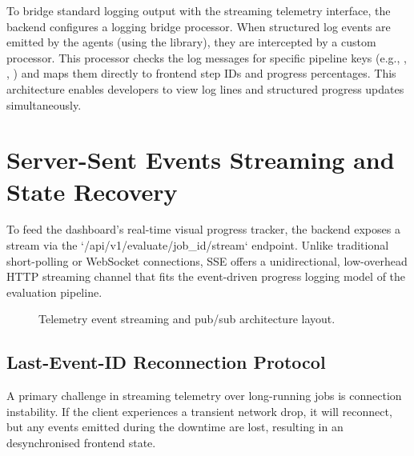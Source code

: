 To bridge standard logging output with the streaming telemetry interface, the backend configures a logging bridge processor. When structured log events are emitted by the agents (using the  library), they are intercepted by a custom processor. This processor checks the log messages for specific pipeline keys (e.g., , , ) and maps them directly to frontend step IDs and progress percentages. This architecture enables developers to view log lines and structured progress updates simultaneously.


\section{Server-Sent Events Streaming and State Recovery}
\label{sec:sse-streaming}

To feed the dashboard's real-time visual progress tracker, the backend exposes a  stream via the `/api/v1/evaluate/{job_id}/stream` endpoint. Unlike traditional short-polling or WebSocket connections, SSE offers a unidirectional, low-overhead HTTP streaming channel that fits the event-driven progress logging model of the evaluation pipeline.

\begin{figure}[htbp]
  \centering
  \caption{Telemetry event streaming and pub/sub architecture layout.}
  \label{fig:telemetry-infrastructure}
\end{figure}

\subsection{Last-Event-ID Reconnection Protocol}
\label{sec:reconnection-protocol}

A primary challenge in streaming telemetry over long-running jobs is connection instability. If the client experiences a transient network drop, it will reconnect, but any events emitted during the downtime are lost, resulting in an desynchronised frontend state. 

